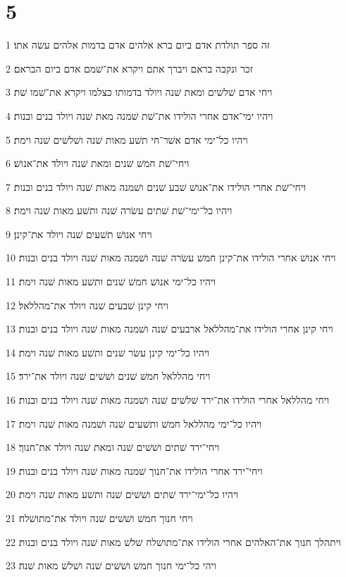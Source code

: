 \chapter{5}

\par 1 זה ספר תולדת אדם ביום ברא אלהים אדם בדמות אלהים עשׂה אתו׃
\par 2 זכר ונקבה בראם ויברך אתם ויקרא את־שׁמם אדם ביום הבראם׃
\par 3 ויחי אדם שׁלשׁים ומאת שׁנה ויולד בדמותו כצלמו ויקרא את־שׁמו שׁת׃
\par 4 ויהיו ימי־אדם אחרי הולידו את־שׁת שׁמנה מאת שׁנה ויולד בנים ובנות׃
\par 5 ויהיו כל־ימי אדם אשׁר־חי תשׁע מאות שׁנה ושׁלשׁים שׁנה וימת׃
\par 6 ויחי־שׁת חמשׁ שׁנים ומאת שׁנה ויולד את־אנושׁ׃
\par 7 ויחי־שׁת אחרי הולידו את־אנושׁ שׁבע שׁנים ושׁמנה מאות שׁנה ויולד בנים ובנות׃
\par 8 ויהיו כל־ימי־שׁת שׁתים עשׂרה שׁנה ותשׁע מאות שׁנה וימת׃
\par 9 ויחי אנושׁ תשׁעים שׁנה ויולד את־קינן׃
\par 10 ויחי אנושׁ אחרי הולידו את־קינן חמשׁ עשׂרה שׁנה ושׁמנה מאות שׁנה ויולד בנים ובנות׃
\par 11 ויהיו כל־ימי אנושׁ חמשׁ שׁנים ותשׁע מאות שׁנה וימת׃
\par 12 ויחי קינן שׁבעים שׁנה ויולד את־מהללאל׃
\par 13 ויחי קינן אחרי הולידו את־מהללאל ארבעים שׁנה ושׁמנה מאות שׁנה ויולד בנים ובנות׃
\par 14 ויהיו כל־ימי קינן עשׂר שׁנים ותשׁע מאות שׁנה וימת׃
\par 15 ויחי מהללאל חמשׁ שׁנים ושׁשׁים שׁנה ויולד את־ירד׃
\par 16 ויחי מהללאל אחרי הולידו את־ירד שׁלשׁים שׁנה ושׁמנה מאות שׁנה ויולד בנים ובנות׃
\par 17 ויהיו כל־ימי מהללאל חמשׁ ותשׁעים שׁנה ושׁמנה מאות שׁנה וימת׃
\par 18 ויחי־ירד שׁתים ושׁשׁים שׁנה ומאת שׁנה ויולד את־חנוך׃
\par 19 ויחי־ירד אחרי הולידו את־חנוך שׁמנה מאות שׁנה ויולד בנים ובנות׃
\par 20 ויהיו כל־ימי־ירד שׁתים ושׁשׁים שׁנה ותשׁע מאות שׁנה וימת׃
\par 21 ויחי חנוך חמשׁ ושׁשׁים שׁנה ויולד את־מתושׁלח׃
\par 22 ויתהלך חנוך את־האלהים אחרי הולידו את־מתושׁלח שׁלשׁ מאות שׁנה ויולד בנים ובנות׃
\par 23 ויהי כל־ימי חנוך חמשׁ ושׁשׁים שׁנה ושׁלשׁ מאות שׁנה׃
